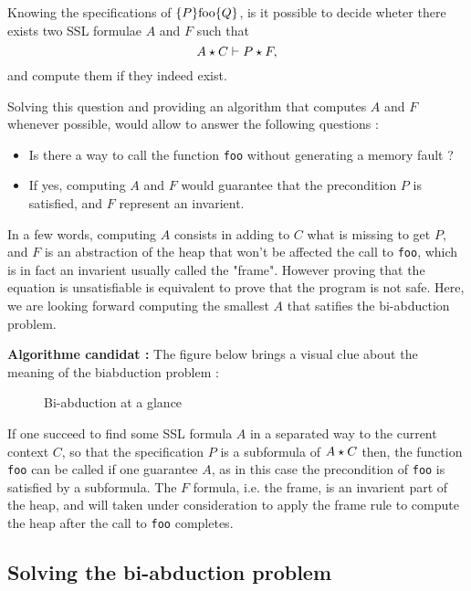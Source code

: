 Knowing the specifications of $\Pre \mbox{\lstinline!foo!} \Post$, is it possible
to decide wheter there exists two SSL formulae $A$ and $F$ such that 
$$A \star C \vdash P \star F,$$
and compute them if they indeed exist.

Solving this question and providing an algorithm that computes $A$ and $F$ whenever
possible, would allow to answer the following questions :
\begin{itemize}
\item Is there a way to call the function \lstinline!foo! without generating a
memory fault ?
\item If yes, computing $A$ and $F$ would guarantee that the precondition $P$
is satisfied, and $F$ represent an invarient. 
\end{itemize} 

In a few words, computing $A$ consists in adding to $C$ what is missing to 
get $P$, and $F$ is an abstraction of the heap that won't be affected the call to \lstinline!foo!, which is in fact an invarient usually called the "frame".
However proving that the equation is unsatisfiable is equivalent to prove
that the program is not safe.
Here, we are looking forward computing the smallest $A$ that satifies the bi-abduction problem.

\textbf{Algorithme candidat :}
The figure below brings a visual clue about the meaning of the biabduction problem :

\begin{figure}[!htbf]
\label{fig:biabdprinciple}
\begin{center}
\resizebox{10cm}{!}{}
\end{center}
\caption{Bi-abduction at a glance}
\end{figure}

If one succeed to find some SSL formula $A$ in a separated way to the current
context $C$, so that the specification $P$ is a subformula of $A \star C$ then,
the function \lstinline!foo! can be called if one guarantee $A$, as  in this case the precondition of \lstinline!foo! is satisfied by a subformula.
The $F$ formula, i.e. the frame, is an invarient part of the heap, and will taken
under consideration to apply the frame rule to compute the heap after the call
to \lstinline!foo! completes.

\subsection{Solving the bi-abduction problem}

